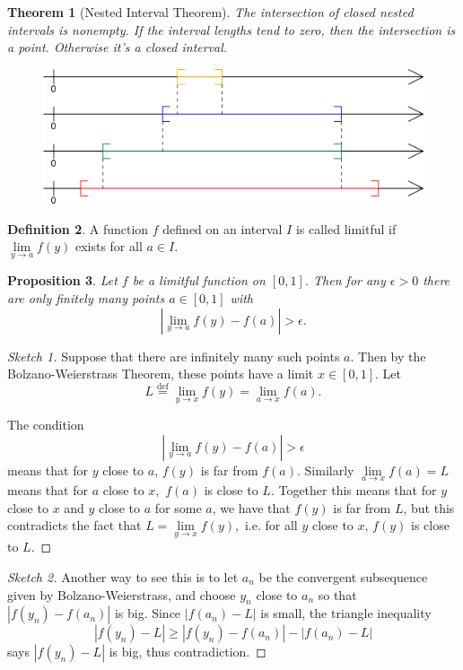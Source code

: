 \documentclass[12pt]{article}
\theoremstyle{plain}
\newtheorem{theorem}{Theorem}
\newtheorem{proposition}[theorem]{Proposition}
\theoremstyle{definition}
\newtheorem{definition}[theorem]{Definition}
\theoremstyle{remark}
\newcommand{\defeq}{\overset{\mathrm{def}}{=}}
\begin{document}
\begin{theorem}[Nested Interval Theorem]
The intersection of closed nested intervals is nonempty. If the interval lengths tend to zero, then the intersection is a point. Otherwise it's a closed interval.
\end{theorem}

\begin{figure}[H]
\centering
\includegraphics[width=1.0\textwidth]{511px-Illustration_nested_intervals}
\end{figure}

\begin{definition}
A function $f$ defined on an interval $I$ is called limitful if $\lim\limits_{y\to a} f(y)$ exists for all $a \in I$.
\end{definition}

\begin{proposition}
Let $f$ be a limitful function on $[0, 1]$. Then for any $\epsilon > 0$ there are only finitely many points $a \in [0, 1]$ with $$|\lim\limits_{y\to a} f(y) - f(a)| > \epsilon.$$
\end{proposition}

\begin{proof}[Sketch 1]
Suppose that there are infinitely many such points $a.$ Then by the Bolzano-Weierstrass Theorem, these points have a limit $x \in [0, 1].$ Let $$L \defeq \lim\limits_{y \to x} f(y) = \lim\limits_{a\to x} f(a).$$

The condition $$|\lim\limits_{y\to a} f(y) - f(a)| > \epsilon$$ means that for $y$ close to $a$, $f(y)$ is far from $f(a).$ Similarly $\lim\limits_{a \to x} f(a) = L$ means that for $a$ close to $x,$ $f(a)$ is close to $L.$ Together this means that for $y$ close to $x$ and $y$ close to $a$ for some $a$, we have that $f(y)$ is far from $L$, but this contradicts the fact that $L = \lim\limits_{y \to x} f(y),$ i.e. for all $y$ close to $x$, $f(y)$ is close to $L.$
\end{proof}

\begin{proof}[Sketch 2]
Another way to see this is to let $a_n$ be the convergent subsequence given by Bolzano-Weierstrass, and choose $y_n$ close to $a_n$ so that $|f(y_n) - f(a_n)|$ is big. Since $|f(a_n) - L|$ is small, the triangle inequality 
$$|f(y_n) - L| \geq |f(y_n) - f(a_n)| - |f(a_n) - L|$$ 
says $|f(y_n) - L|$ is big, thus contradiction.
\end{proof}
\end{document}
